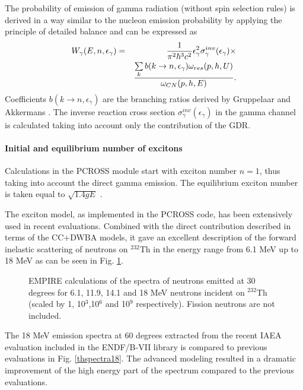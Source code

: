The probability of emission of gamma radiation (without spin selection
rules) is derived in a way similar to the nucleon emission probability by
applying the principle of detailed balance \cite%
{Pluyko:78,Betak:79,Akkermans:85} and can be expressed as%
\begin{eqnarray}
W_{\gamma }(E,n,\epsilon _{\gamma })&=&\frac{1}{\pi ^{2}\hbar ^{3}c^{2}}%
\epsilon _{\gamma }^{2}\sigma _{\gamma }^{inv}(\epsilon _{\gamma })\times
\notag \\
&&\frac{\sum\limits_{k}b(k\rightarrow n,\epsilon _{\gamma })\omega
_{res}(p,h,U)}{\omega _{CN}(p,h,E)}.
\end{eqnarray}%
Coefficients $b(k\rightarrow n,\epsilon _{\gamma })$ are the branching
ratios derived by Gruppelaar and Akkermans \cite{Akkermans:85}. The inverse
reaction cross section $\sigma _{\gamma }^{inv}(\epsilon _{\gamma })$ in
the gamma channel is calculated taking into account only the contribution of
the GDR.

\paragraph{Initial and equilibrium number of excitons}

Calculations in the PCROSS module start with exciton number $n=1$, thus
taking into account the direct gamma emission. The equilibrium exciton
number is taken equal to $\sqrt{1.4 gE}$ \cite{Shang:88,Shang:89}.

\bigskip

The exciton model, as implemented in the PCROSS code, has been extensively
used in recent evaluations. Combined with the direct contribution described in
terms of the CC+DWBA models, it gave an excellent description of the forward
inelastic scattering of neutrons on $^{232}$Th in the energy range from 6.1
MeV up to 18 MeV as can be seen in Fig. \ref{thspectra}.

\begin{figure}[htbp]
\caption{EMPIRE calculations of the spectra of neutrons emitted at 30 degrees
for 6.1, 11.9, 14.1 and 18 MeV neutrons incident on $^{232}$Th (scaled
by 1, 10$^3$,10$^6$ and 10$^9$ respectively). Fission neutrons are not
included.}
\label{thspectra}
\end{figure}

The 18 MeV emission spectra at 60 degrees extracted from the recent IAEA
evaluation included in the ENDF/B-VII library is compared to previous
evaluations in Fig. \ref{thspectra18}. The advanced modeling resulted in a
dramatic improvement of the high energy part of the spectrum compared to the
previous evaluations.

